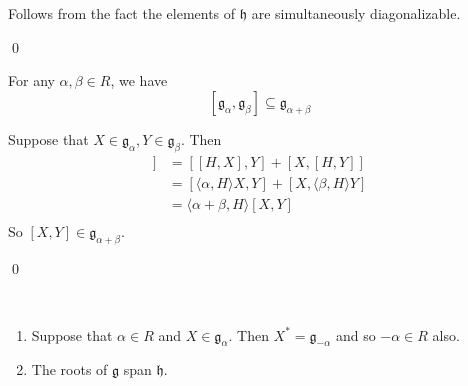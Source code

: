 \documentclass[x11names,reqno,14pt]{extarticle}
\newcommand{\mk}[1]{\mathfrak{#1}}
\newcommand{\g}{\mk{g}}
\newcommand{\h}{\mk{h}}
\begin{document}
Follows from the fact the elements of $\h$ are simultaneously diagonalizable. 

\qed

\prop

For any $\alpha,\beta \in R$, we have
\[
[\g_\alpha,\g_\beta] \subseteq \g_{\alpha+\beta}
\]

\proof

Suppose that $X \in \g_\alpha,Y\in\g_\beta$. Then
\begin{align*}
[H,[X,Y]] & = [[H,X],Y] + [X,[H,Y]] \\
& = [\langle\alpha, H \rangle X, Y] + [X, \langle \beta, H\rangle Y] \\
& = \langle\alpha + \beta, H \rangle[X,Y] \\
\end{align*}
So $[X,Y]\in\g_{\alpha+\beta}$. 

\qed

\prop

\,
\begin{enumerate}

\item Suppose that $\alpha\in R$ and $X \in \g_\alpha$. Then $X^* = \g_{-\alpha}$ and so $-\alpha\in R$ also. 

\item The roots of $\g$ span $\h$. 

\end{enumerate}

\proof

\,
\end{document}
